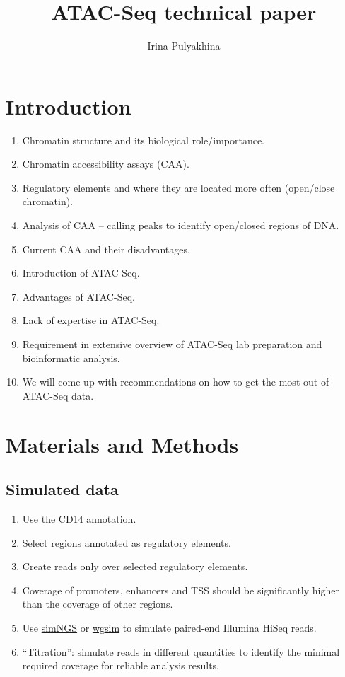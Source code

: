 \documentclass[11pt]{article}
\title{\textbf{ATAC-Seq technical paper}}
\author{Irina Pulyakhina}
\date{}
\begin{document}
\maketitle

\renewcommand\labelitemi{\tiny$\bullet$}

\section{Introduction}
\begin{enumerate}
\itemsep0em
  \item Chromatin structure and its biological role/importance.
  \item Chromatin accessibility assays (CAA).
  \item Regulatory elements and where they are located more often (open/close chromatin).
  \item Analysis of CAA -- calling peaks to identify open/closed regions of DNA.
  \item Current CAA and their disadvantages.
  \item Introduction of ATAC-Seq.
  \item Advantages of ATAC-Seq.
  \item Lack of expertise in ATAC-Seq.
  \item Requirement in extensive overview of ATAC-Seq lab preparation and bioinformatic analysis.
  \item We will come up with recommendations on how to get the most out of ATAC-Seq data.
\end{enumerate}

\section{Materials and Methods}
\subsection{Simulated data}
\begin{enumerate}
\itemsep0em
  \item Use the CD14 annotation.
  \item Select regions annotated as regulatory elements.
  \item Create reads only over selected regulatory elements.
  \item Coverage of promoters, enhancers and TSS should be significantly
        higher than the coverage of other regions.
  \item Use \href{http://www.ebi.ac.uk/goldman-srv/simNGS/}{simNGS} or
        \href{http://samtools.sourceforge.net/}{wgsim} to simulate
        paired-end Illumina HiSeq reads.
  \item ``Titration'': simulate reads in different quantities to
        identify the minimal required coverage for reliable analysis
        results.
\end{enumerate}
\end{document}
